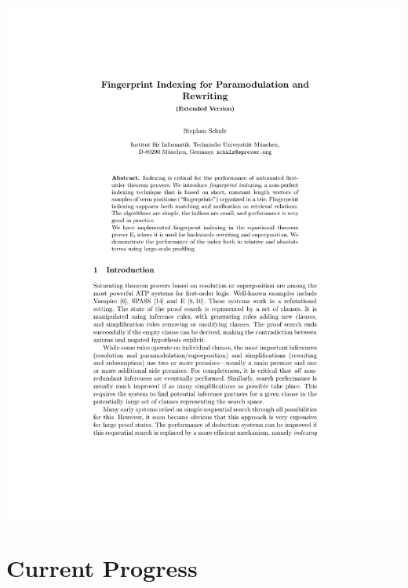 \documentclass[10pt]{beamer}
\begin{document}
\begin{NoHyper}
\begin{frame}
\begin{center}
  \hspace{1cm}
  \includegraphics[page=14,scale=0.5,trim=6cm 16.2cm 7cm 4cm,clip]{schulz_fp-index_ext}
  \end{center}
\end{frame}

\section{Current Progress}


\end{NoHyper}
\end{document}
